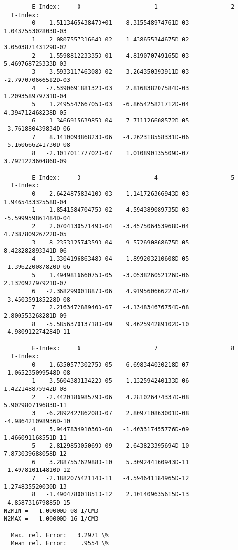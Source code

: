 \documentclass[12pt,dvipdfmx]{article}
\begin{document}
{\begin{small}
\begin{verbatim}
        E-Index:     0                     1                     2
  T-Index:
        0   -1.511346543847D+01   -8.315548974761D-03    1.043755302803D-03
        1    2.080755731664D-02   -1.438655344675D-02    3.050387143129D-02
        2   -1.559881223335D-01   -4.819070749165D-03    5.469768725333D-03
        3    3.593311746308D-02   -3.264350393911D-03   -2.797070666582D-03
        4   -7.539069188132D-03    2.816838207584D-03    1.209358979731D-04
        5    1.249554266705D-03   -6.865425821712D-04    4.394712468238D-05
        6   -1.346691563985D-04    7.711126608572D-05   -3.761880439834D-06
        7    8.141009386823D-06   -4.262318558331D-06   -5.160666241730D-08
        8   -2.101701177702D-07    1.010890135509D-07    3.792122360486D-09

        E-Index:     3                     4                     5
  T-Index:
        0    2.642487583410D-03   -1.141726366943D-03    1.946543332558D-04
        1   -1.854158470475D-02    4.594389089735D-03   -5.599959861484D-04
        2    2.070413057149D-04   -3.457506453968D-04    4.738780926722D-05
        3    8.235312574359D-04   -9.572690868675D-05    8.428282893341D-06
        4   -1.330419686348D-04    1.899203210608D-05   -1.396220087820D-06
        5    1.494981666075D-05   -3.053826052126D-06    2.132092797921D-07
        6   -2.368299001887D-06    4.919560666227D-07   -3.450359185228D-08
        7    2.216347288940D-07   -4.134834676754D-08    2.800553268281D-09
        8   -5.585637013718D-09    9.462594289102D-10   -4.980912274284D-11

        E-Index:     6                     7                     8
  T-Index:
        0   -1.635057730275D-05    6.698344020218D-07   -1.065235099548D-08
        1    3.560438313422D-05   -1.132594240133D-06    1.422148875942D-08
        2   -2.442018698579D-06    4.281026474337D-08    5.902980719683D-11
        3   -6.289242286208D-07    2.809710863001D-08   -4.986421098936D-10
        4    5.944783491030D-08   -1.403317455776D-09    1.466091168551D-11
        5   -2.812985305069D-09   -2.643823395694D-10    7.873039688058D-12
        6    3.288755762988D-10    5.309244160943D-11   -1.497810114810D-12
        7   -2.188207542114D-11   -4.594641184965D-12    1.274835520030D-13
        8   -1.490478001851D-12    2.101409635615D-13   -4.858731679885D-15
N2MIN =   1.00000D 08 1/CM3
N2MAX =   1.00000D 16 1/CM3

  Max. rel. Error:   3.2971 \%
  Mean rel. Error:    .9554 \%




\end{verbatim}
\end{small}}
\end{document}
